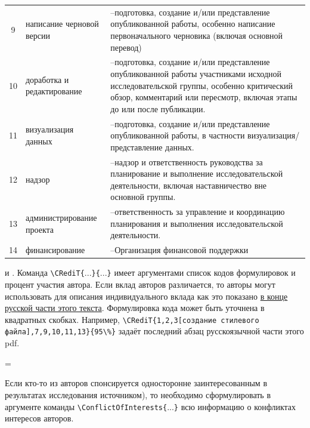 \documentclass{psta}%
\begin{document}
\begin{landscape}
\begin{table}
\begin{tabular}{|c|>{\raggedright}m{3cm}<{\baselineskip7pt}|m{115mm}<{\baselineskip7pt}|}
9 & написание черновой версии &\---подготовка, создание и/или представление опубликованной работы, особенно написание первоначального черновика (включая основной перевод)\\
10 & доработка и редактирование &\---подготовка, создание и/или представление опубликованной работы участниками исходной исследовательской группы, особенно критический обзор, комментарий или пересмотр, включая этапы до или после публикации.\\
11 & визуализация данных &\---подготовка, создание и/или представление опубликованной работы, в частности визуализация/представление данных.\\
12 & надзор &\---надзор и ответственность руководства за планирование и выполнение исследовательской деятельности, включая наставничество вне основной группы.\\
13 & администрирование проекта &\---ответственность за управление и координацию планирования и выполнения исследовательской деятельности.\\
14 & финансирование &\---Организация финансовой поддержки\\
\hline
\end{tabular}
\vskip -3cm
\end{table}
\end{landscape} \noindent %
\newline\noindent
  и .
Команда  \verb|\CRediT{|...\verb|}{|...\verb|}| имеет аргументами
 список кодов формулировок и процент участия автора.
Если вклад авторов различается, то авторы могут использовать для описания индивидуального вклада как это показано \hyperlink{AuthorContfibution}{в конце русской части этого текста}.
Формулировка кода может быть уточнена в квадратных скобках. Например,
\verb|\CRediT{1,2,3[создание стилевого файла],7,9,10,11,13}{95\%}| задаёт последний абзац русскоязычной части этого pdf.

\par\pagegoal=\vsize %

Если кто-то из авторов спонсируется односторонне заинтересованным в результатах исследования источником), то необходимо сформулировать в аргументе команды \verb|\ConflictOfInterests{|...\verb|}| всю информацию о конфликтах интересов авторов.
\end{document}
